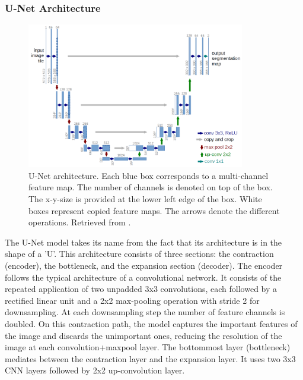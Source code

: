 \subsubsection*{U-Net Architecture}

\begin{figure}[!htb]
  \centering
  \includegraphics[width=0.85\textwidth]{Images/u-net-architecture.jpg}
  \caption[U-Net architecture.  Each blue box corresponds to a multi-channel feature map. The number of channels is denoted on top of the box. The x-y-size is provided at the lower left edge of the box. White boxes represent copied feature maps. The arrows denote the different operations.]{U-Net architecture. Each blue box corresponds to a multi-channel feature map. The number of channels is denoted on top of the box. The x-y-size is provided at the lower left edge of the box. White boxes represent copied feature maps. The arrows denote the different operations. Retrieved from \cite{Unet:2D}.}
  \label{fig:Unet:2D}
\end{figure}

The U-Net model takes its name from the fact that its architecture is in the shape of a 'U'. This architecture consists of three sections: the contraction (encoder), the bottleneck, and the expansion section (decoder). The encoder follows the typical architecture of a convolutional network. It consists of the repeated application of two unpadded 3x3 convolutions, each followed by a rectified linear unit and a 2x2 max-pooling operation with stride 2 for downsampling. At each downsampling step the number of feature channels is doubled. On this contraction path, the model captures the important features of the image and discards the unimportant ones, reducing the resolution of the image at each convolution+maxpool layer. The bottommost layer (bottleneck) mediates between the contraction layer and the expansion layer. It uses two 3x3 \ac{CNN} layers followed by 2x2 up-convolution layer.

